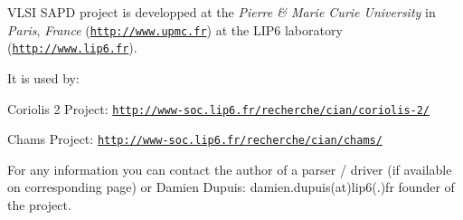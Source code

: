 V\-L\-S\-I S\-A\-P\-D project is developped at the {\itshape Pierre \& Marie Curie University} in {\itshape Paris}, {\itshape France} (\href{http://www.upmc.fr}{\tt http\-://www.\-upmc.\-fr}) at the L\-I\-P6 laboratory (\href{http://www.lip6.fr}{\tt http\-://www.\-lip6.\-fr}).\par
\par
 It is used by\-:
\begin{DoxyItemize}
\item Coriolis 2 Project\-: \href{http://www-soc.lip6.fr/recherche/cian/coriolis-2/}{\tt http\-://www-\/soc.\-lip6.\-fr/recherche/cian/coriolis-\/2/}
\item Chams Project\-: \href{http://www-soc.lip6.fr/recherche/cian/chams/}{\tt http\-://www-\/soc.\-lip6.\-fr/recherche/cian/chams/}\par
\par
 For any information you can contact the author of a parser / driver (if available on corresponding page) or Damien Dupuis\-: damien.\-dupuis(at)lip6(.)fr founder of the project. 
\end{DoxyItemize}